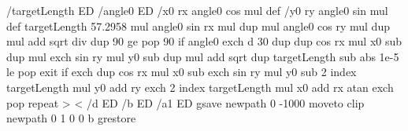 %
%
	/targetLength ED /angle0 ED
	/x0 rx angle0 cos mul def
	/y0 ry angle0 sin mul def
	targetLength 57.2958 mul
	angle0 sin rx mul dup mul
	angle0 cos ry mul dup mul
	add sqrt div
	dup 90 ge { pop 90 } if
	angle0 exch d
	30
	{ dup
	dup cos rx mul x0 sub dup mul exch sin ry mul y0 sub dup mul add sqrt
	dup targetLength sub abs 1e-5 le { pop exit } if
	exch dup cos rx mul x0 sub  exch sin ry mul y0 sub
	2 index \tx@Div targetLength mul y0 add ry \tx@Div exch
	2 index \tx@Div targetLength mul x0 add rx \tx@Div
	atan exch pop
	} repeat
>
<%
	/d ED      %
	/b ED      %
	/a1 ED     %
	gsave
	newpath
	0 -1000 moveto
	clip                  %
	newpath
	0 1 0 0 b             %
	grestore
